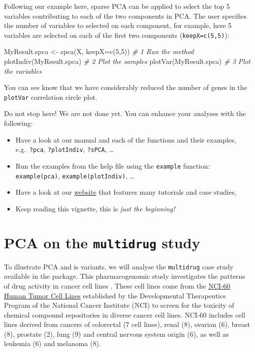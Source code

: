 \documentclass[
]{book}
\newenvironment{Shaded}{\begin{snugshade}}{\end{snugshade}}
\newcommand{\AttributeTok}[1]{\textcolor[rgb]{0.77,0.63,0.00}{#1}}
\newcommand{\CommentTok}[1]{\textcolor[rgb]{0.56,0.35,0.01}{\textit{#1}}}
\newcommand{\DecValTok}[1]{\textcolor[rgb]{0.00,0.00,0.81}{#1}}
\newcommand{\FunctionTok}[1]{\textcolor[rgb]{0.00,0.00,0.00}{#1}}
\newcommand{\NormalTok}[1]{#1}
\newcommand{\OtherTok}[1]{\textcolor[rgb]{0.56,0.35,0.01}{#1}}
\begin{document}
Following our example here, sparse PCA can be applied to select the top 5 variables contributing to each of the two components in PCA. The user specifies the number of variables to selected on each component, for example, here 5 variables are selected on each of the first two components (\texttt{keepX=c(5,5)}):

\begin{Shaded}
\begin{Highlighting}[]
\NormalTok{MyResult.spca }\OtherTok{\textless{}{-}} \FunctionTok{spca}\NormalTok{(X, }\AttributeTok{keepX=}\FunctionTok{c}\NormalTok{(}\DecValTok{5}\NormalTok{,}\DecValTok{5}\NormalTok{)) }\CommentTok{\# 1 Run the method}
\FunctionTok{plotIndiv}\NormalTok{(MyResult.spca)               }\CommentTok{\# 2 Plot the samples}
\FunctionTok{plotVar}\NormalTok{(MyResult.spca)                 }\CommentTok{\# 3 Plot the variables}
\end{Highlighting}
\end{Shaded}

You can see know that we have considerably reduced the number of genes in the \texttt{plotVar} correlation circle plot.

Do not stop here! We are not done yet. You can enhance your analyses with the following:

\begin{itemize}
\item
  Have a look at our manual and each of the functions and their examples, e.g.~\texttt{?pca}, \texttt{?plotIndiv}, \texttt{?sPCA}, \ldots{}
\item
  Run the examples from the help file using the \texttt{example} function: \texttt{example(pca)}, \texttt{example(plotIndiv)}, \ldots{}
\item
  Have a look at our \href{http://www.mixomics.org}{website} that features many tutorials and case studies,
\item
  Keep reading this vignette, this is \emph{just the beginning!}
\end{itemize}

\hypertarget{03}{%
\chapter{\texorpdfstring{PCA on the \texttt{multidrug} study}{PCA on the multidrug study}}\label{03}}

To illustrate PCA and is variants, we will analyse the \texttt{multidrug} case study available in the package. This pharmacogenomic study investigates the patterns of drug activity in cancer cell lines \citep{Sza04}. These cell lines come from the \href{https://dtp.cancer.gov/discovery_development/nci-60/}{NCI-60 Human Tumor Cell Lines} established by the Developmental Therapeutics Program of the National Cancer Institute (NCI) to screen for the toxicity of chemical compound repositories in diverse cancer cell lines. NCI-60 includes cell lines derived from cancers of colorectal (7 cell lines), renal (8), ovarian (6), breast (8), prostate (2), lung (9) and central nervous system origin (6), as well as leukemia (6) and melanoma (8).
\end{document}
